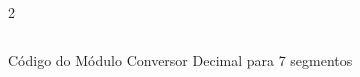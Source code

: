 \begin{figure}[H]
    \centering   
    \begin{tcolorbox}  
        \begin{multicols}{2} 
        \fontsize{9pt}{9pt}\selectfont\inputminted[obeytabs=true,tabsize=4,xleftmargin=20pt,linenos,breaklines]{VHDL}{VHDL/files/int7seg.vhd}    
        \end{multicols}
    \end{tcolorbox}   
    \caption{Código do Módulo Conversor Decimal para 7 segmentos}
\end{figure}